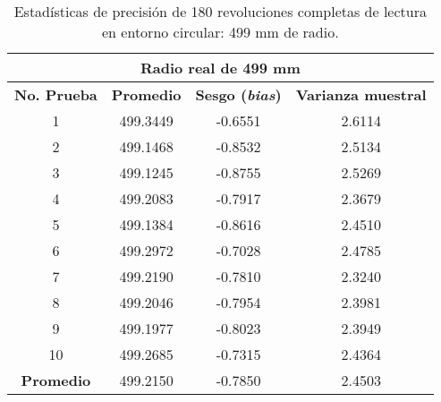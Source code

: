 \begin{table}[H]
	\centering
	\begin{tabular}{|c|c|c|c|}
		\hline
		\multicolumn{4}{|c|}{\textbf{Radio real de 499 mm}} \\ \hline
		\textbf{No. Prueba} & \textbf{Promedio} & \textbf{Sesgo (\textit{bias})} & \textbf{Varianza muestral} \\ \hline
		1 & 499.3449 & -0.6551 & 2.6114 \\ 
		2 & 499.1468 & -0.8532 & 2.5134 \\ 
		3 & 499.1245 & -0.8755 & 2.5269 \\ 
		4 & 499.2083 & -0.7917 & 2.3679 \\ 
		5 & 499.1384 & -0.8616 & 2.4510 \\ 
		6 & 499.2972 & -0.7028 & 2.4785 \\ 
		7 & 499.2190 & -0.7810 & 2.3240 \\ 
		8 & 499.2046 & -0.7954 & 2.3981 \\ 
		9 & 499.1977 & -0.8023 & 2.3949 \\ 
		10 & 499.2685 & -0.7315 & 2.4364 \\ \hline
		\textbf{Promedio} & 499.2150 & -0.7850 & 2.4503 \\ \hline
	\end{tabular}
	\caption{Estadísticas de precisión de 180 revoluciones completas de lectura en entorno circular: 499 mm de radio.}
	\label{fig:tabla_dists8}
\end{table}
